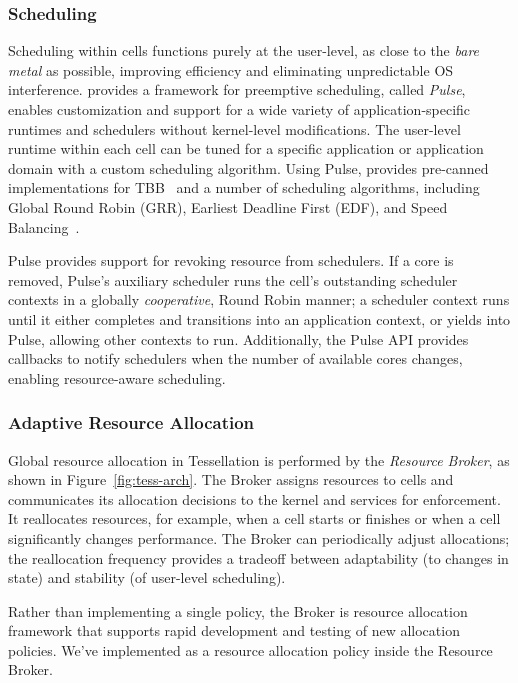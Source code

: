 \subsubsection{Scheduling}
Scheduling within cells functions purely at the user-level, as
close to the \emph{bare metal} as possible, improving efficiency and
eliminating unpredictable OS interference.  \tess provides a framework for preemptive
scheduling, called \emph{Pulse}, enables customization and support for a wide
variety of application-specific runtimes and schedulers without
kernel-level modifications. 
The user-level runtime within each cell can be tuned for a specific
application or application domain with a custom scheduling algorithm.
Using Pulse, \tess provides pre-canned
implementations for TBB~\cite{tbb07} and a number of scheduling algorithms,
including Global Round Robin (GRR), Earliest Deadline First
(EDF), and Speed Balancing~\cite{juggle2013}.  
 
Pulse provides support for revoking resource from schedulers. If a core is removed, Pulse's auxiliary scheduler runs the cell's outstanding scheduler contexts in
a globally \emph{cooperative}, Round Robin manner; \ie a scheduler context runs
until it either completes and transitions into an application context, or yields
into Pulse, allowing other contexts to run. Additionally, the Pulse API provides callbacks to notify schedulers when the number of available cores
changes, enabling resource-aware scheduling. 

\subsubsection{Adaptive Resource Allocation} \label{sec:rsc-alloc}

Global resource allocation in Tessellation is performed by the \emph{Resource Broker}, as
shown in Figure~\ref{fig:tess-arch}. The Broker assigns 
resources to cells and communicates its allocation decisions to the kernel
and services for enforcement.  It reallocates resources,
for example, when a cell starts or finishes or when a cell significantly
changes performance.  The Broker can periodically adjust allocations; the
reallocation frequency provides a tradeoff between adaptability (to
changes in state) and stability (of user-level scheduling).

Rather than implementing a single policy, the Broker is resource allocation framework that supports
rapid development and testing of new allocation policies. We've implemented \pacora as a resource allocation policy inside the Resource Broker.
 


